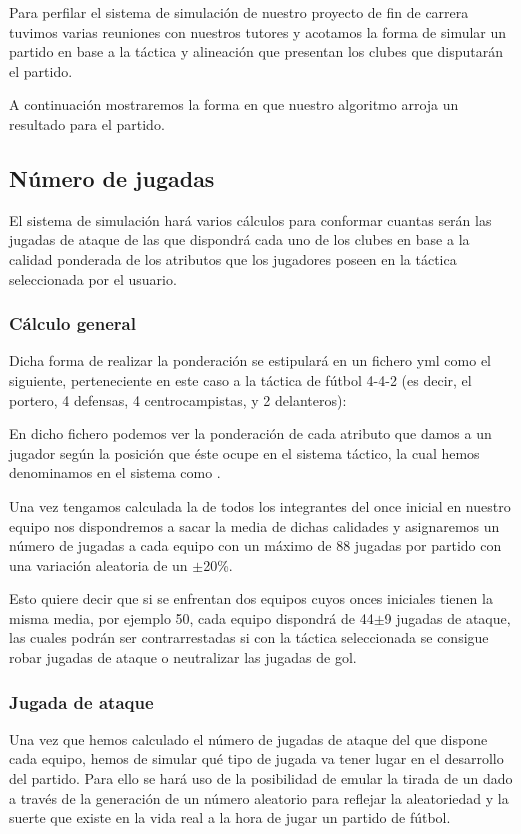Para perfilar el sistema de simulación de nuestro proyecto de fin de carrera
tuvimos varias reuniones con nuestros tutores y acotamos la forma de simular un
partido en base a la táctica y alineación que presentan los clubes que
disputarán el partido.

A continuación mostraremos la forma en que nuestro algoritmo arroja un resultado
para el partido.

\subsection{Número de jugadas}
El sistema de simulación hará varios cálculos para conformar cuantas serán las
jugadas de ataque de las que dispondrá cada uno de los clubes en base a la
calidad ponderada de los atributos que los jugadores poseen en la táctica
seleccionada por el usuario.
\subsubsection{Cálculo general}
Dicha forma de realizar la ponderación se estipulará en un fichero yml como el
siguiente, perteneciente en este caso a la táctica de fútbol 4-4-2 (es decir, el
portero, 4 defensas, 4 centrocampistas, y 2 delanteros):



En dicho fichero podemos ver la ponderación de cada atributo que damos a un
jugador según la posición que éste ocupe en el sistema táctico, la cual hemos
denominamos en el sistema como .

Una vez tengamos calculada la  de todos los integrantes
del once inicial en nuestro equipo nos dispondremos a sacar la media de dichas
calidades y asignaremos un número de jugadas a cada equipo con un máximo de 88
jugadas por partido con una variación aleatoria de un $\pm$20\%.

Esto quiere decir que si se enfrentan dos equipos cuyos onces iniciales tienen
la misma media, por ejemplo 50, cada equipo dispondrá de 44$\pm$9 jugadas de
ataque, las cuales podrán ser contrarrestadas si con la táctica seleccionada se
consigue robar jugadas de ataque o neutralizar las jugadas de gol.

\subsubsection{Jugada de ataque}
Una vez que hemos calculado el número de jugadas de ataque del que dispone cada
equipo, hemos de simular qué tipo de jugada va tener lugar en el desarrollo del
partido. Para ello se hará uso de la posibilidad de emular la tirada de un dado
a través de la generación de un número aleatorio para reflejar la aleatoriedad y
la suerte que existe en la vida real a la hora de jugar un partido de fútbol.

